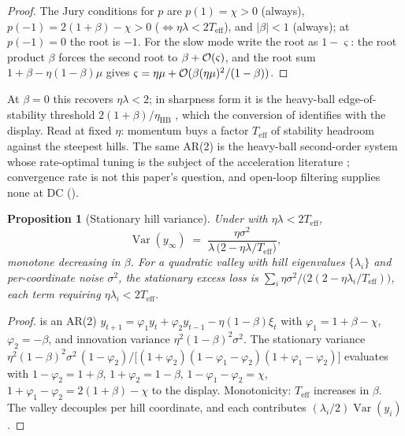 \documentclass[11pt,a4paper]{article}
\newtheorem{proposition}{Proposition}
\theoremstyle{remark}
\newcommand{\Teff}{T_{\mathrm{eff}}}
\begin{document}
\begin{proof}
The Jury conditions for $p$ are $p(1)=\chi>0$ (always), $p(-1)=2(1+\beta)-\chi>0$ ($\Leftrightarrow\eta\lambda<2\Teff$), and $\lvert\beta\rvert<1$ (always); at $p(-1)=0$ the root is $-1$.
For the slow mode write the root as $1-\varsigma$: the root product $\beta$ forces the second root to $\beta+\mathcal{O}(\varsigma)$, and the root sum $1+\beta-\eta(1-\beta)\mu$ gives $\varsigma=\eta\mu+\mathcal{O}(\beta(\eta\mu)^2/(1-\beta))$.
\end{proof}

At $\beta=0$ this recovers $\eta\lambda<2$; in sharpness form it is the heavy-ball edge-of-stability threshold $2(1+\beta)/\eta_{\mathrm{HB}}$ \citep{cohen2021edge,andreyev2026momentum}, which the conversion of  identifies with the display.
Read at fixed $\eta$: momentum buys a factor $\Teff$ of stability headroom against the steepest hills.
The same AR(2) is the heavy-ball second-order system whose rate-optimal tuning is the subject of the acceleration literature \citep{polyak1964momentum,lessard2016analysis}; convergence rate is not this paper's question, and open-loop filtering supplies none at DC ().

\begin{proposition}[Stationary hill variance]
\label{prop:variance}
Under  with $\eta\lambda<2\Teff$,
\[
\operatorname{Var}(y_\infty)\;=\;\frac{\eta\sigma^2}{\lambda\,\bigl(2-\eta\lambda/\Teff\bigr)},
\]
monotone decreasing in $\beta$.
For a quadratic valley with hill eigenvalues $\{\lambda_i\}$ and per-coordinate noise $\sigma^2$, the stationary excess loss is $\sum_i\eta\sigma^2/\bigl(2(2-\eta\lambda_i/\Teff)\bigr)$, each term requiring $\eta\lambda_i<2\Teff$.
\end{proposition}

\begin{proof}
 is an AR(2) $y_{t+1}=\varphi_1y_t+\varphi_2y_{t-1}-\eta(1-\beta)\xi_t$ with $\varphi_1=1+\beta-\chi$, $\varphi_2=-\beta$, and innovation variance $\eta^2(1-\beta)^2\sigma^2$.
The stationary variance $\eta^2(1-\beta)^2\sigma^2\,(1-\varphi_2)/\bigl[(1+\varphi_2)(1-\varphi_1-\varphi_2)(1+\varphi_1-\varphi_2)\bigr]$ evaluates with $1-\varphi_2=1+\beta$, $1+\varphi_2=1-\beta$, $1-\varphi_1-\varphi_2=\chi$, $1+\varphi_1-\varphi_2=2(1+\beta)-\chi$ to the display.
Monotonicity: $\Teff$ increases in $\beta$.
The valley decouples per hill coordinate, and each contributes $(\lambda_i/2)\operatorname{Var}(y_i)$.
\end{proof}
\end{document}
